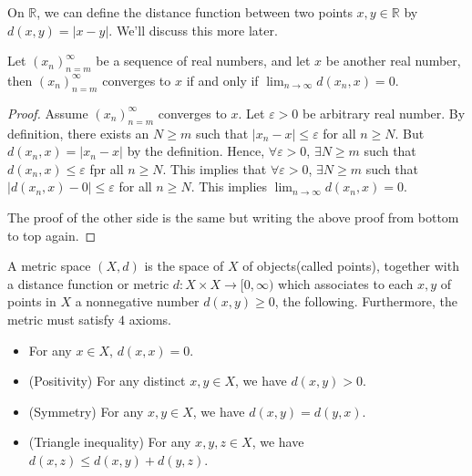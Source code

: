 On \(\mathbb{R} \), we can define the distance function between two points \(x,y \in \mathbb{R} \) by \(d(x,y) = \vert x-y \vert \). We'll discuss this more later. 
\begin{lemma}
    Let \((x_n)_{n=m}^{\infty} \) be a sequence of real numbers, and let \(x\) be another real number, then \((x_n)_{n=m}^{\infty} \) converges to \(x\) if and only if \(\lim_{n \to \infty} d(x_n, x) = 0 \).   
\end{lemma}  
\begin{proof}
    Assume \((x_n)_{n=m}^{\infty} \) converges to \(x\). Let \(\varepsilon > 0\) be arbitrary real number. By definition, there exists an \(N \ge m\) such that \(\vert x_n - x \vert \le \varepsilon  \) for all \(n \ge N\). But \(d(x_n, x) = \vert x_n - x \vert \) by the definition. Hence, \(\forall \varepsilon > 0\), \(\exists N \ge m\) such that \(d(x_n, x) \le \varepsilon \) fpr all \(n \ge N\). This implies that \(\forall \varepsilon > 0\), \(\exists N \ge m\) such that \(\left\vert d(x_n, x) - 0 \right\vert \le \varepsilon  \) for all \(n \ge N\). This implies \(\lim_{n \to \infty} d(x_n, x) = 0 \). 
    
    The proof of the other side is the same but writing the above proof from bottom to top again.
\end{proof}

\begin{definition}\label{dfn: metric space}
    A metric space \((X, d)\) is the space of \(X\) of objects(called points), together with a distance function or metric \(d: X \times X \to [0, \infty )\) which associates to each \(x, y\) of points in \(X\) a nonnegative number \(d(x,y) \ge 0\), the following. Furthermore, the metric must satisfy \(4\) axioms. 
    \begin{itemize}
        \item [(a)] For any \(x \in X\), \(d(x,x) = 0\). 
        \item [(b)] (Positivity) For any distinct \(x, y \in X\), we have \(d(x,y) > 0\). 
        \item [(c)] (Symmetry) For any \(x,y \in X\), we have \(d(x,y) = d(y,x)\). 
        \item [(d)] (Triangle inequality) For any \(x,y,z \in X\), we have \(d(x,z) \le d(x,y) + d(y,z)\).         
    \end{itemize}       
\end{definition}

